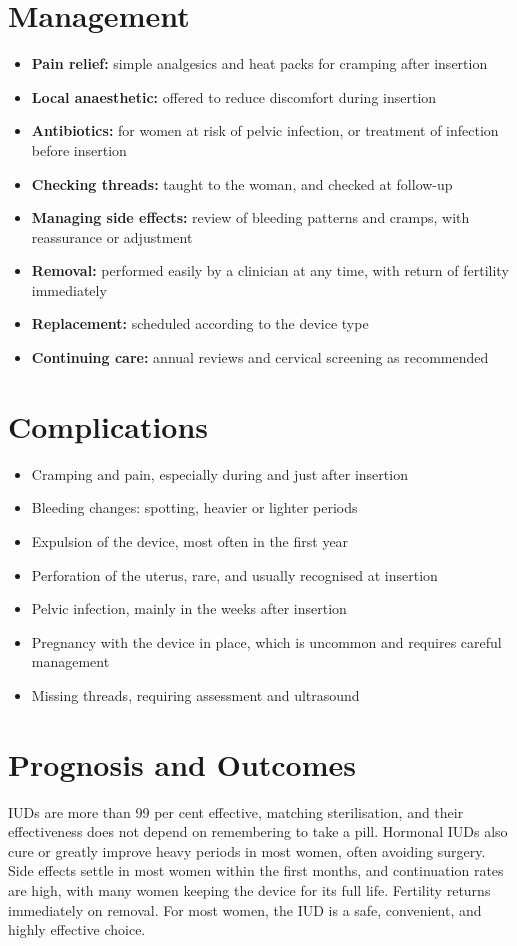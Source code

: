 \section*{Management}
\begin{itemize}
    \item \textbf{Pain relief:} simple analgesics and heat packs for cramping after insertion
    \item \textbf{Local anaesthetic:} offered to reduce discomfort during insertion
    \item \textbf{Antibiotics:} for women at risk of pelvic infection, or treatment of infection before insertion
    \item \textbf{Checking threads:} taught to the woman, and checked at follow-up
    \item \textbf{Managing side effects:} review of bleeding patterns and cramps, with reassurance or adjustment
    \item \textbf{Removal:} performed easily by a clinician at any time, with return of fertility immediately
    \item \textbf{Replacement:} scheduled according to the device type
    \item \textbf{Continuing care:} annual reviews and cervical screening as recommended
\end{itemize}

\section*{Complications}
\begin{itemize}
    \item Cramping and pain, especially during and just after insertion
    \item Bleeding changes: spotting, heavier or lighter periods
    \item Expulsion of the device, most often in the first year
    \item Perforation of the uterus, rare, and usually recognised at insertion
    \item Pelvic infection, mainly in the weeks after insertion
    \item Pregnancy with the device in place, which is uncommon and requires careful management
    \item Missing threads, requiring assessment and ultrasound
\end{itemize}

\section*{Prognosis and Outcomes}
IUDs are more than 99 per cent effective, matching sterilisation, and their effectiveness does not depend on remembering to take a pill. Hormonal IUDs also cure or greatly improve heavy periods in most women, often avoiding surgery. Side effects settle in most women within the first months, and continuation rates are high, with many women keeping the device for its full life. Fertility returns immediately on removal. For most women, the IUD is a safe, convenient, and highly effective choice.

